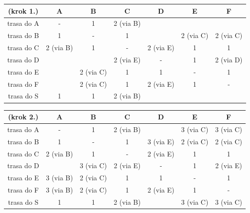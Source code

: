 \documentclass[a4paper,12pt]{article}
\begin{document}
\begin{center}
    \begin{tabular}{|c|c|c|c|c|c|c|}
        \hline
        (krok 1.)   & A         & B         & C         & D         & E         & F         \\ \hline
        trasa do A  & -         & 1         & 2 (via B) &           &           &           \\ \hline
        trasa do B  & 1         & -         & 1         &           & 2 (via C) & 2 (via C) \\ \hline
        trasa do C  & 2 (via B) & 1         & -         & 2 (via E) & 1         & 1         \\ \hline
        trasa do D  &           &           & 2 (via E) & -         & 1         & 2 (via D) \\ \hline
        trasa do E  &           & 2 (via C) & 1         & 1         & -         & 1         \\ \hline
        trasa do F  &           & 2 (via C) & 1         & 2 (via E) & 1         & -         \\ \hline
        trasa do S  & 1         & 1         & 2 (via B) &           &           &           \\ \hline
    \end{tabular}
\end{center}

\begin{center}
    \begin{tabular}{|c|c|c|c|c|c|c|}
        \hline
        (krok 2.)   & A         & B         & C         & D         & E         & F         \\ \hline
        trasa do A  & -         & 1         & 2 (via B) &           & 3 (via C) & 3 (via C) \\ \hline
        trasa do B  & 1         & -         & 1         & 3 (via E) & 2 (via C) & 2 (via C) \\ \hline
        trasa do C  & 2 (via B) & 1         & -         & 2 (via E) & 1         & 1         \\ \hline
        trasa do D  &           & 3 (via C) & 2 (via E) & -         & 1         & 2 (via E) \\ \hline
        trasa do E  & 3 (via B) & 2 (via C) & 1         & 1         & -         & 1         \\ \hline
        trasa do F  & 3 (via B) & 2 (via C) & 1         & 2 (via E) & 1         & -         \\ \hline
        trasa do S  & 1         & 1         & 2 (via B) &           & 3 (via C) & 3 (via C) \\ \hline
    \end{tabular}
\end{center}
\end{document}

